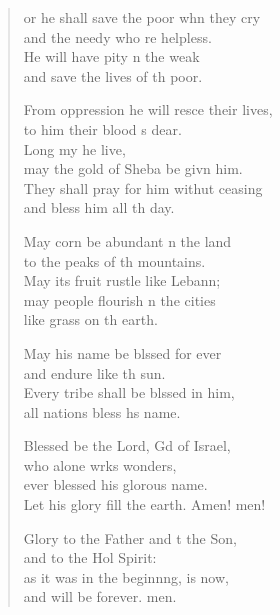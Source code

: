 \settowidth{\versewidth}{From oppression he will rescue their lives, *}
\begin{verse}%
  \begin{patverse}
or he shall save the poor whn they cry\Med\\
and the needy who re helpless.\\
He will have pity n the weak\Med\\
and save the lives of th poor.

From oppression he will resce their lives,\Med\\
to him their blood \pointup{\i}s dear.\\
Long my he live,\Med\\
may the gold of Sheba be givn him.\\
They shall pray for him withut ceasing\Med\\
and bless him all th day.

May corn be abundant \pointup{\i}n the land\Med\\
to the peaks of th mountains.\\
May its fruit rustle like Lebann;\Flex\\
may people flourish \pointup{\i}n the cities\Med\\
like grass on th earth.

May his name be blssed for ever\Med\\
and endure like th sun.\\
Every tribe shall be blssed in him,\Med\\
all nations bless h\pointup{\i}s name.

Blessed be the Lord, Gd of Israel,\Med\\
who alone wrks wonders,\\
ever blessed his glor\pointup{\i}ous name.\Med\\
Let his glory fill the earth. Amen! men!

Glory to the Father and t the Son,\Med\\
and to the Hol Spirit:\\
as it was in the beginn\pointup{\i}ng, is now,\Med\\
and will be forever. men.
  \end{patverse}
\end{verse}
